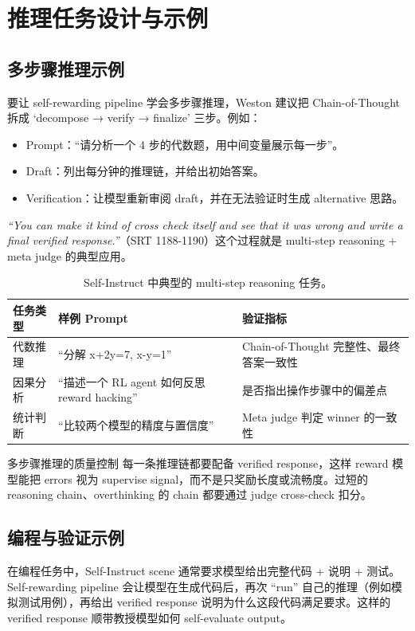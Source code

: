\section{推理任务设计与示例}
\subsection{多步骤推理示例}
要让 self-rewarding pipeline 学会多步骤推理，Weston 建议把 Chain-of-Thought 拆成 `decompose → verify → finalize' 三步。例如：
\begin{itemize}
    \item Prompt：``请分析一个 4 步的代数题，用中间变量展示每一步''。
    \item Draft：列出每分钟的推理链，并给出初始答案。
    \item Verification：让模型重新审阅 draft，并在无法验证时生成 alternative 思路。
\end{itemize}
\textit{``You can make it kind of cross check itself and see that it was wrong and write a final verified response.''}（SRT 1188-1190）这个过程就是 multi-step reasoning + meta judge 的典型应用。

\begin{table}[H]
\centering
\begin{tabular}{p{4cm}p{4cm}p{6cm}}
\toprule
任务类型 & 样例 Prompt & 验证指标 \\
\midrule
代数推理 & ``分解 x+2y=7, x-y=1'' & Chain-of-Thought 完整性、最终答案一致性 \\
因果分析 & ``描述一个 RL agent 如何反思 reward hacking'' & 是否指出操作步骤中的偏差点 \\
统计判断 & ``比较两个模型的精度与置信度'' & Meta judge 判定 winner 的一致性 \\
\bottomrule
\end{tabular}
\caption{Self-Instruct 中典型的 multi-step reasoning 任务。}
\end{table}

\begin{knowledgebox}{多步骤推理的质量控制}
每一条推理链都要配备 verified response，这样 reward 模型能把 errors 视为 supervise signal，而不是只奖励长度或流畅度。过短的 reasoning chain、overthinking 的 chain 都要通过 judge cross-check 扣分。
\end{knowledgebox}

\subsection{编程与验证示例}
在编程任务中，Self-Instruct scene 通常要求模型给出完整代码 + 说明 + 测试。Self-rewarding pipeline 会让模型在生成代码后，再次 ``run'' 自己的推理（例如模拟测试用例），再给出 verified response 说明为什么这段代码满足要求。这样的 verified response 顺带教授模型如何 self-evaluate output。

